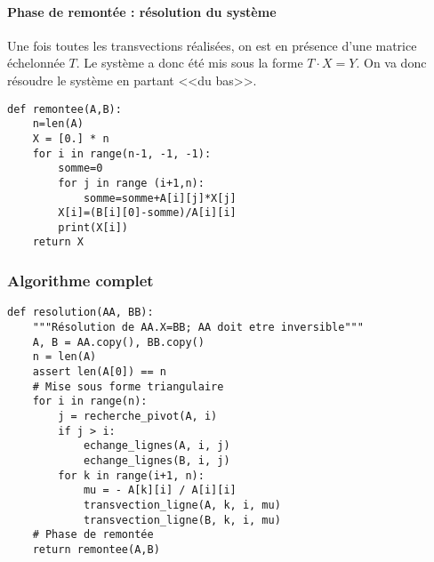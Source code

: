 \paragraph*{Phase de remontée : résolution du système}
Une fois toutes les transvections réalisées, on est en présence d'une matrice échelonnée $T$. Le système a donc été mis sous la forme $T\cdot X = Y$. On va donc résoudre le système en partant <<du bas>>.

\begin{lstlisting}
def remontee(A,B):
    n=len(A)
    X = [0.] * n
    for i in range(n-1, -1, -1):
        somme=0
        for j in range (i+1,n):
            somme=somme+A[i][j]*X[j]
        X[i]=(B[i][0]-somme)/A[i][i]
        print(X[i])
    return X
\end{lstlisting}

 

\subsubsection{Algorithme complet}

\begin{lstlisting}
def resolution(AA, BB):
    """Résolution de AA.X=BB; AA doit etre inversible"""
    A, B = AA.copy(), BB.copy()
    n = len(A)
    assert len(A[0]) == n
    # Mise sous forme triangulaire
    for i in range(n):
        j = recherche_pivot(A, i)
        if j > i:
            echange_lignes(A, i, j)
            echange_lignes(B, i, j)
        for k in range(i+1, n):
            mu = - A[k][i] / A[i][i]
            transvection_ligne(A, k, i, mu)
            transvection_ligne(B, k, i, mu)
    # Phase de remontée
    return remontee(A,B)
\end{lstlisting}

%
%

